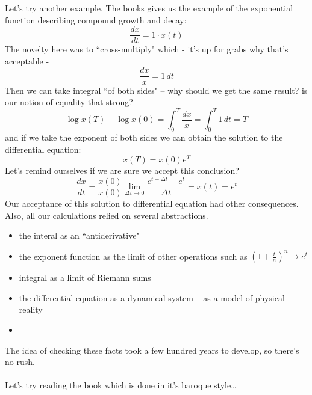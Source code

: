 \documentclass[12pt]{article}
\begin{document}
{\noindent Let's try another example.  The books gives us the example of the exponential function describing compound growth and decay:
$$ \frac{dx}{dt} = 1 \cdot x(t)  $$
The novelty here was to ``cross-multiply" which - it's up for grabs why that's acceptable - 
$$ \frac{dx}{x} = 1 \, dt $$
Then we can take integral ``of both sides" -- why should we get the same result?  is our notion of equality that strong?
$$ \log x(T) - \log x(0) =  \int_0^T \frac{ dx}{x} = \int_0^T 1 \, dt = T$$
and if we take the exponent of both sides we can obtain the solution to the differential equation:
$$ x(T) = x(0) e^T $$
Let's remind ourselves if we are sure we accept this conclusion?
$$  \frac{dx}{dt} = \frac{x(0)}{x(0)}  \lim_{\Delta t \to 0} \frac{e^{t+\Delta t} - e^t}{\Delta t} = x(t) = e^t $$
Our acceptance of this solution to differential equation had other consequences.  Also, all our calculations relied on several abstractions.
\begin{itemize}
	\item the interal as an ``antiderivative"
	\item the exponent function as the limit of other operations such as $(1 + \frac{t}{n})^n \to e^t$
	\item integral as a limit of Riemann sums
	\item the differential equation as a dynamical system -- as a model of physical reality
	\item 
\end{itemize}
The idea of checking these facts took a few hundred years to develop, so there's no rush. \\ \\
Let's try reading the book which is done in it's baroque style\dots

\newpage

}
\end{document}
